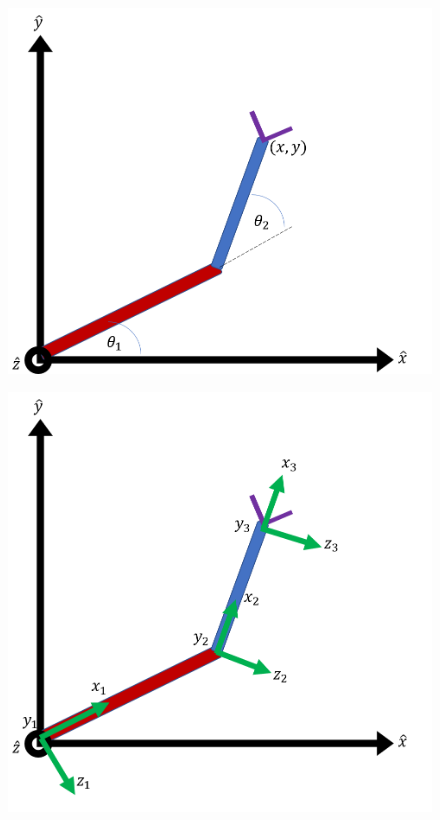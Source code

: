 \documentclass[12pt]{article}
\theoremstyle{definition}
\begin{document}
\begin{figure}
    \centering
    \begin{minipage}{.45\textwidth}
        \includegraphics[width=0.8\linewidth]{images/robot-arm.png}
        \label{fig:2-link-arm}
    \end{minipage}
    \hfill
    \begin{minipage}{.45\textwidth}
        \includegraphics[width=0.8\linewidth]{images/robot-arm-frames.png}
        \label{fig:planar-singular-frames}
    \end{minipage}
\end{figure}
\end{document}
